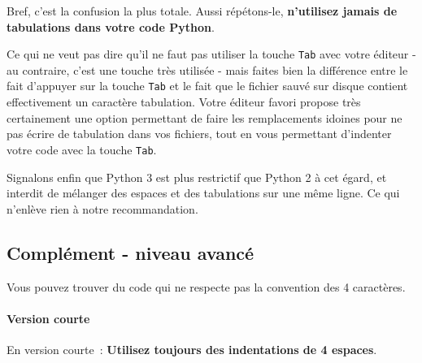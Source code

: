     \begin{Shaded}
\begin{Highlighting}[frame=lines,framerule=0.6mm,rulecolor=\color{asisframecolor}]
  
          
\OperatorTok{=} 
            \NormalTok{(}\NormalTok{)}
        \NormalTok{:}
\OperatorTok{=} 
            \NormalTok{(}\NormalTok{)}
\end{Highlighting}
\end{Shaded}

    Bref, c'est la confusion la plus totale. Aussi répétons-le,
\textbf{n'utilisez jamais de tabulations dans votre code Python}.

    Ce qui ne veut pas dire qu'il ne faut pas utiliser la touche
\texttt{Tab} avec votre éditeur - au contraire, c'est une touche très
utilisée - mais faites bien la différence entre le fait d'appuyer sur la
touche \texttt{Tab} et le fait que le fichier sauvé sur disque contient
effectivement un caractère tabulation. Votre éditeur favori propose très
certainement une option permettant de faire les remplacements idoines
pour ne pas écrire de tabulation dans vos fichiers, tout en vous
permettant d'indenter votre code avec la touche \texttt{Tab}.

    Signalons enfin que Python 3 est plus restrictif que Python 2 à cet
égard, et interdit de mélanger des espaces et des tabulations sur une
même ligne. Ce qui n'enlève rien à notre recommandation.

    \hypertarget{compluxe9ment---niveau-avancuxe9}{%
\subsection{Complément - niveau
avancé}\label{compluxe9ment---niveau-avancuxe9}}

    Vous pouvez trouver du code qui ne respecte pas la convention des 4
caractères.

    \hypertarget{version-courte}{%
\paragraph{Version courte}\label{version-courte}}

    En version courte~: \textbf{Utilisez toujours des indentations de 4
espaces}.

